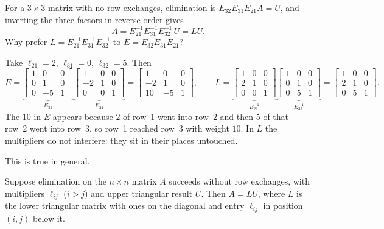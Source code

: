 For a $3\times3$ matrix with no row exchanges, elimination is
$E_{32}E_{31}E_{21}A=U$, and inverting the three factors in reverse order gives
\[
  A=E_{21}^{-1}E_{31}^{-1}E_{32}^{-1}\,U=LU .
\]
Why prefer $L=E_{21}^{-1}E_{31}^{-1}E_{32}^{-1}$ to $E=E_{32}E_{31}E_{21}$?

\begin{example}\label{ex:u05-EvsL}
Take $\ell_{21}=2$, $\ell_{31}=0$, $\ell_{32}=5$. Then
\[
  E=\underbrace{\begin{bmatrix} 1&0&0\\ 0&1&0\\ 0&-5&1\end{bmatrix}}_{E_{32}}
  \underbrace{\begin{bmatrix} 1&0&0\\ -2&1&0\\ 0&0&1\end{bmatrix}}_{E_{21}}
  =\begin{bmatrix} 1&0&0\\ -2&1&0\\ 10&-5&1\end{bmatrix},
  \qquad
  L=\underbrace{\begin{bmatrix} 1&0&0\\ 2&1&0\\ 0&0&1\end{bmatrix}}_{E_{21}^{-1}}
  \underbrace{\begin{bmatrix} 1&0&0\\ 0&1&0\\ 0&5&1\end{bmatrix}}_{E_{32}^{-1}}
  =\begin{bmatrix} 1&0&0\\ 2&1&0\\ 0&5&1\end{bmatrix}.
\]
The $10$ in $E$ appears because $2$ of row~1 went into row~2 and then $5$ of that row~2 went
into row~3, so row~1 reached row~3 with weight $10$. In $L$ the multipliers do not interfere:
they sit in their places untouched.
\end{example}

This is true in general.

\begin{theorem}\label{thm:u05-LU}
Suppose elimination on the $n\times n$ matrix $A$ succeeds without row exchanges, with
multipliers $\ell_{ij}$ ($i>j$) and upper triangular result $U$. Then $A=LU$, where $L$ is the
lower triangular matrix with ones on the diagonal and entry $\ell_{ij}$ in position $(i,j)$
below it.
\end{theorem}

